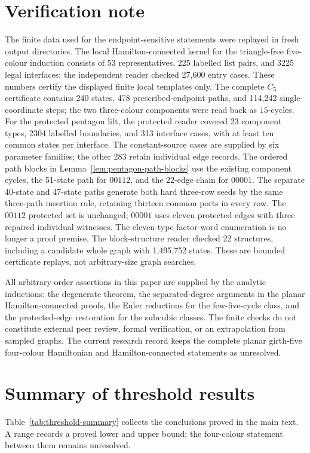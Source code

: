 \documentclass[11pt]{article}
\theoremstyle{remark}
\numberwithin{equation}{section}
\numberwithin{table}{section}
\begin{document}
\section{Verification note}
\label{sec:verification}

The finite data used for the endpoint-sensitive statements were replayed in fresh output directories.  The local Hamilton-connected kernel for the triangle-free five-colour induction consists of 53 representatives, 225 labelled list pairs, and 3225 legal interfaces; the independent reader checked 27,600 entry cases.  These numbers certify the displayed finite local templates only.  The complete $C_5$ certificate contains 240 states, 478 prescribed-endpoint paths, and 114,242 single-coordinate steps; the two three-colour components were read back as $15$-cycles.  For the protected pentagon lift, the protected reader covered 23 component types, 2304 labelled boundaries, and 313 interface cases, with at least ten common states per interface. The constant-source cases are supplied by six parameter families; the other 283 retain individual edge records. The ordered path blocks in Lemma~\ref{lem:pentagon-path-blocks} use the existing component cycles, the 51-state path for $00112$, and the 22-edge chain for $00001$. The separate 40-state and 47-state paths generate both hard three-row seeds by the same three-path insertion rule, retaining thirteen common ports in every row. The $00112$ protected set is unchanged; $00001$ uses eleven protected edges with three repaired individual witnesses. The eleven-type factor-word enumeration is no longer a proof premise.  The block-structure reader checked 22 structures, including a candidate whole graph with 1,495,752 states.  These are bounded certificate replays, not arbitrary-size graph searches.

All arbitrary-order assertions in this paper are supplied by the analytic inductions: the degenerate theorem, the separated-degree arguments in the planar Hamilton-connected proofs, the Euler reductions for the few-five-cycle class, and the protected-edge restoration for the subcubic classes.  The finite checks do not constitute external peer review, formal verification, or an extrapolation from sampled graphs.  The current research record keeps the complete planar girth-five four-colour Hamiltonian and Hamilton-connected statements as unresolved.

\clearpage
\appendix
\section{Summary of threshold results}
\label{app:threshold-summary}
Table~\ref{tab:threshold-summary} collects the conclusions proved in the
main text. A range records a proved lower and upper bound; the
four-colour statement between them remains unresolved.
\end{document}
